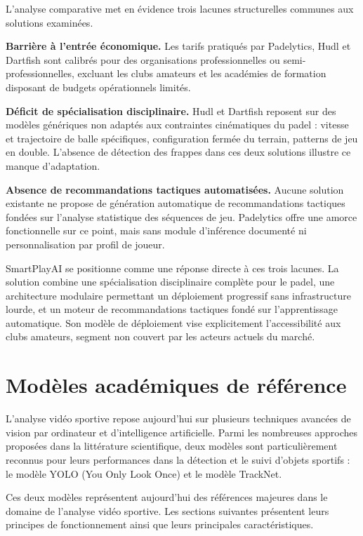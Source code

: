 \begin{itemize}
L'analyse comparative met en évidence trois lacunes structurelles communes aux solutions examinées.

\textbf{Barrière à l'entrée économique.} Les tarifs pratiqués par Padelytics, Hudl et Dartfish sont calibrés pour des organisations professionnelles ou semi-professionnelles, excluant les clubs amateurs et les académies de formation disposant de budgets opérationnels limités.

\textbf{Déficit de spécialisation disciplinaire.} Hudl et Dartfish reposent sur des modèles génériques non adaptés aux contraintes cinématiques du padel : vitesse et trajectoire de balle spécifiques, configuration fermée du terrain, patterns de jeu en double. L'absence de détection des frappes dans ces deux solutions illustre ce manque d'adaptation.

\textbf{Absence de recommandations tactiques automatisées.} Aucune solution existante ne propose de génération automatique de recommandations tactiques fondées sur l'analyse statistique des séquences de jeu. Padelytics offre une amorce fonctionnelle sur ce point, mais sans module d'inférence documenté ni personnalisation par profil de joueur.

SmartPlayAI se positionne comme une réponse directe à ces trois lacunes. La solution combine une spécialisation disciplinaire complète pour le padel, une architecture modulaire permettant un déploiement progressif sans infrastructure lourde, et un moteur de recommandations tactiques fondé sur l'apprentissage automatique. Son modèle de déploiement vise explicitement l'accessibilité aux clubs amateurs, segment non couvert par les acteurs actuels du marché.
\section{Modèles académiques de référence}

L'analyse vidéo sportive repose aujourd'hui sur plusieurs techniques avancées de vision par ordinateur et d'intelligence artificielle. Parmi les nombreuses approches proposées dans la littérature scientifique, deux modèles sont particulièrement reconnus pour leurs performances dans la détection et le suivi d'objets sportifs : le modèle YOLO (You Only Look Once) et le modèle TrackNet.

Ces deux modèles représentent aujourd'hui des références majeures dans le domaine de l'analyse vidéo sportive. Les sections suivantes présentent leurs principes de fonctionnement ainsi que leurs principales caractéristiques.

\end{itemize}
